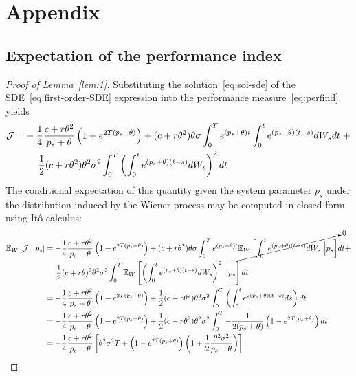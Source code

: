 \chapter*{Appendix}
\appendix
\label{ch:appendix}

\section*{Expectation of the performance index}
\label{sec:app_expectation}

\begin{proof}[Proof of Lemma~\ref{lem:1}]
%
Substituting the solution~\eqref{eq:sol-sde} of the
SDE~\eqref{eq:first-order-SDE} expression into the performance
measure~\eqref{eq:perfind} yields
%
\begin{align*} \mathcal{J} =
        & -\frac{1}{4}\frac{c+r\theta^2}{p_s+\theta}\left(1 +
        e^{2T(p_s+\theta)}\right) + 
        (c+r\theta^2)\theta\sigma \int_0^T
        e^{(p_s+\theta)t} \int_0^t e^{(p_s+\theta)(t-s)}dW_s
        dt \; + \\ & \hspace{0.5cm}\frac{1}{2}(c+r\theta^2)\theta^2
        \sigma^2 \int_0^T \left( \int_0^t
        e^{(p_s+\theta)(t-s)} dW_s  \right)^2 dt 
\end{align*}
%
The conditional expectation of this quantity given the system parameter $p_s$
under the distribution induced by the Wiener process may be computed in
closed-form using It\^{o} calculus:
%
\begin{align*} 
\mathbb{E}_W\left[\mathcal{J} \mid p_s \right]
        &= -\frac{1}{4}\frac{c+r\theta^2}{p_s+\theta}\left(1 -
        e^{2T(p_s+\theta)}\right) +
        (c+r\theta^2)\theta\sigma\int_0^Te^{(p_s+\theta)t}\cancelto{0}{\mathbb{E}_W\left[\int_0^t
        e^{(p_s+\theta)(t-s)} dW_s~\Big\rvert p_s\right]} dt + \\
        & \hspace{0.5cm} \frac{1}{2}(c+r\theta)^2\theta^2\sigma^2\int_0^T\mathbb{E}_W\left[\left(\int_0^t
        e^{(p_s+\theta)(t-s)} dW_s \right)^2~\bigg\rvert p_s\right] dt \\
        &=-\frac{1}{4}\frac{c+r\theta^2}{p_s+\theta}\left(1 -
        e^{2T(p_s+\theta)}\right) + 
        \frac{1}{2}(c+r\theta^2)\theta^2\sigma^2\int_0^T\left(\int_0^t
        e^{2(p_s+\theta)(t-s)} ds \right) dt \\ 
        &=-\frac{1}{4}\frac{c+r\theta^2}{p_s+\theta}\left(1 - e^{2T(p_s+\theta)}\right) + 
        \frac{1}{2}(c+r\theta^2)\theta^2\sigma^2\int_0^T
        -\frac{1}{2(p_s+\theta)}\left(1 - e^{2T(p_s+\theta)}\right) dt \\ 
        &=-\frac{1}{4}\frac{c+r\theta^2}{p_s+\theta} \left[ \theta^2 \sigma^2 T +
        \left(1 - e^{2T(p_s+\theta)}\right) \left(1 +
        \frac{1}{2}\frac{\theta^2\sigma^2}{p_s+\theta}\right)\right].  
\end{align*}
%
\end{proof}

